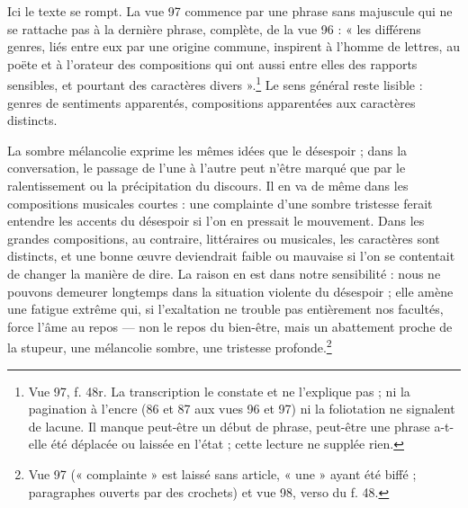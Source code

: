 \documentclass[11pt,a4paper]{article}
\begin{document}
Ici le texte se rompt. La vue 97 commence par une phrase sans majuscule qui ne se
rattache pas à la dernière phrase, complète, de la vue 96 : « les différens
genres, liés entre eux par une origine commune, inspirent à l'homme de lettres, au
poëte et à l'orateur des compositions qui ont aussi entre elles des rapports
sensibles, et pourtant des caractères divers ».\footnote{Vue 97, f. 48r. La
transcription le constate et ne l'explique pas ; ni la pagination à l'encre (86
et 87 aux vues 96 et 97) ni la foliotation ne signalent de lacune. Il manque
peut-être un début de phrase, peut-être une phrase a-t-elle été déplacée ou
laissée en l'état ; cette lecture ne supplée rien.} Le sens général reste
lisible : genres de sentiments apparentés, compositions apparentées aux
caractères distincts.

La sombre mélancolie exprime les mêmes idées que le désespoir ; dans la
conversation, le passage de l'une à l'autre peut n'être marqué que par le
ralentissement ou la précipitation du discours. Il en va de même dans les
compositions musicales courtes : une complainte d'une sombre tristesse ferait
entendre les accents du désespoir si l'on en pressait le mouvement. Dans les
grandes compositions, au contraire, littéraires ou musicales, les caractères sont
distincts, et une bonne œuvre deviendrait faible ou mauvaise si l'on se contentait
de changer la manière de dire. La raison en est dans notre sensibilité : nous ne
pouvons demeurer longtemps dans la situation violente du désespoir ; elle amène
une fatigue extrême qui, si l'exaltation ne trouble pas entièrement nos facultés,
force l'âme au repos — non le repos du bien-être, mais un abattement proche de la
stupeur, une mélancolie sombre, une tristesse profonde.\footnote{Vue 97
(« complainte » est laissé sans article, « une » ayant été biffé ; paragraphes
ouverts par des crochets) et vue 98, verso du f. 48.}
\end{document}
